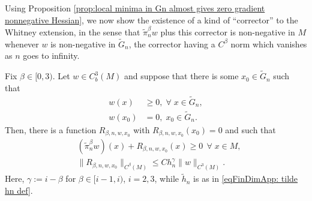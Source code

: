 \documentclass[11pt,reqno]{amsart}
\numberwithin{equation}{section}
\theoremstyle{plain}
\begin{document}
Using Proposition \ref{prop:local minima in Gn almost gives zero gradient nonnegative Hessian}, we now show the existence of a kind of ``corrector'' to the Whitney extension, in the sense that $\tilde \pi_n^\beta w$ plus this corrector is non-negative in $M$ whenever $w$ is non-negative in $\tilde G_n$, the corrector having a $C^\beta$ norm which vanishes as $n$ goes to infinity.
\begin{lem}\label{lem: extension operators preserve order up to small error}
  Fix $\beta \in [0,3)$. Let $w \in C_b^3(M)$ and suppose that there is some $x_0 \in \tilde G_n$ such that
  \begin{align*} 
    w(x) & \geq 0, \;\forall\; x\in \tilde G_n,\\
    w(x_0) & = 0, \;x_0\in \tilde G_n.	  	   
  \end{align*}	  
  Then, there is a function $R_{\beta,n,w,x_0}$ with $R_{\beta,n,w,x_0}(x_0)=0$ and such that
  \begin{align*}
    & (\tilde \pi_n^\beta w)(x)+R_{\beta,n,w,x_0}(x)\geq 0\ \  \forall\; x\in M,\\
    & \|R_{\beta,n,w,x_0}\|_{C^{\beta}(M)} \leq Ch_n^{\gamma}\|w\|_{C^3(M)}.  
  \end{align*}	  
  Here, $\gamma := i-\beta$ for $\beta \in [i-1,i)$, $i=2,3$, while $\tilde h_n$ is as in \eqref{eqFinDimApp: tilde hn def}. 
\end{lem}
\end{document}
